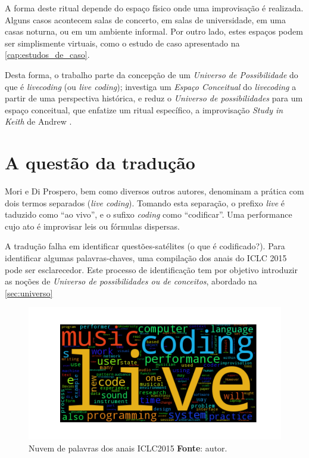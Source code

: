 A forma deste ritual depende do espaço físico onde uma improvisação é realizada. Alguns casos acontecem salas de concerto, em salas de universidade, em uma casas noturna, ou em um ambiente informal. Por outro lado, estes espaços podem ser simplismente virtuais, como o estudo de caso apresentado na \autoref{cap:estudos_de_caso}.

Desta forma, o trabalho parte da concepção de um \emph{Universo de Possibilidade} do que é \emph{livecoding} (ou \emph{live coding}); investiga um \emph{Espaço Conceitual} do \emph{livecoding} a partir de uma perspectiva histórica, e reduz o \emph{Universo de possibilidades} para um espaço conceitual, que enfatize um ritual específico, a improvisação \emph{Study in Keith} de Andrew .

\section{A questão da tradução}\label{sec:traducao}

Mori e Di Prospero, bem como diversos outros autores, denominam a prática com dois termos separados (\emph{live coding}). Tomando esta separação, o prefixo \emph{live} é taduzido como ``ao vivo'', e o sufixo \emph{coding} como ``codificar''. Uma performance cujo ato é improvisar leis ou fórmulas dispersas.

A tradução falha em identificar questões-satélites (o que é codificado?). Para identificar algumas palavras-chaves, uma compilação dos anais do ICLC 2015 \cite{ICLC2015} pode ser esclarecedor. Este processo de identificação tem por objetivo introduzir as noções de \emph{Universo de possibilidades ou de conceitos}, abordado na \autoref{sec:universo}

\begin{figure}[!h]
\begin{center}
\centering
\includegraphics[scale=0.71]{./imagens/livecoding_cloud1.png}
\caption{Nuvem de palavras dos anais ICLC2015 \textbf{Fonte}: autor.}
\label{fig:nuvemlivecoding}
\end{center}
\end{figure}

